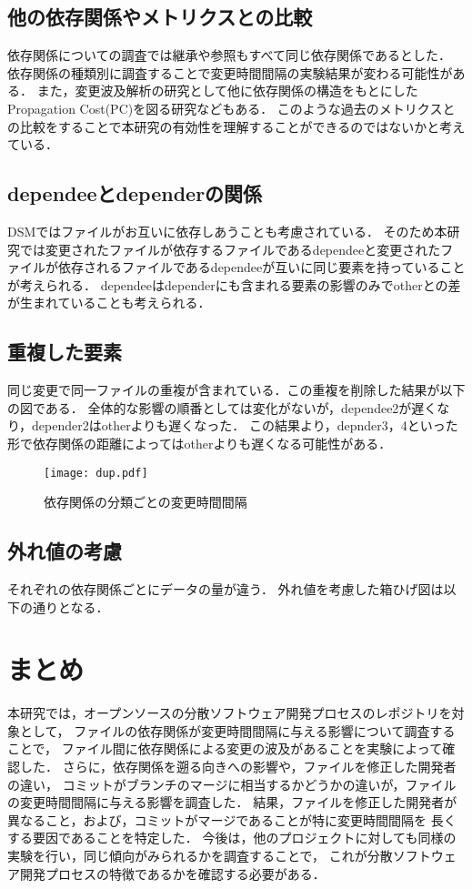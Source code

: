 \documentclass{fose2016}           %
\begin{document}
\subsection*{他の依存関係やメトリクスとの比較}
依存関係についての調査では継承や参照もすべて同じ依存関係であるとした．
依存関係の種類\cite{Kotani}別に調査することで変更時間間隔の実験結果が変わる可能性がある．
また，変更波及解析の研究として他に依存関係の構造をもとにしたPropagation Cost(PC)を図る研究などもある\cite{Nord}．
このような過去のメトリクスとの比較をすることで本研究の有効性を理解することができるのではないかと考えている．

\subsection*{dependeeとdependerの関係}
DSM\cite{Nord}ではファイルがお互いに依存しあうことも考慮されている．
そのため本研究では変更されたファイルが依存するファイルであるdependeeと変更されたファイルが依存されるファイルであるdependeeが互いに同じ要素を持っていることが考えられる．
dependeeはdependerにも含まれる要素の影響のみでotherとの差が生まれていることも考えられる．

\subsection*{重複した要素}
同じ変更で同一ファイルの重複が含まれている．この重複を削除した結果が以下の図である．
全体的な影響の順番としては変化がないが，dependee2が遅くなり，depender2はotherよりも遅くなった．
この結果より，depnder3，4といった形で依存関係の距離によってはotherよりも遅くなる可能性がある．
\begin{figure}[t]
\centering
\texttt{[image: dup.pdf]}
\caption{依存関係の分類ごとの変更時間間隔}
\label{fig:subdate} 
\end{figure}

\subsection*{外れ値の考慮}
それぞれの依存関係ごとにデータの量が違う．
外れ値を考慮した箱ひげ図は以下の通りとなる．



\section{まとめ} \label{まとめ}
本研究では，オープンソースの分散ソフトウェア開発プロセスのレポジトリを対象として，
ファイルの依存関係が変更時間間隔に与える影響について調査することで，
ファイル間に依存関係による変更の波及があることを実験によって確認した．
さらに，依存関係を遡る向きへの影響や，ファイルを修正した開発者の違い，
コミットがブランチのマージに相当するかどうかの違いが，ファイルの変更時間間隔に与える影響を調査した．
結果，ファイルを修正した開発者が異なること，および，コミットがマージであることが特に変更時間間隔を
長くする要因であることを特定した．
今後は，他のプロジェクトに対しても同様の実験を行い，同じ傾向がみられるかを調査することで，
これが分散ソフトウェア開発プロセスの特徴であるかを確認する必要がある．
\end{document}
